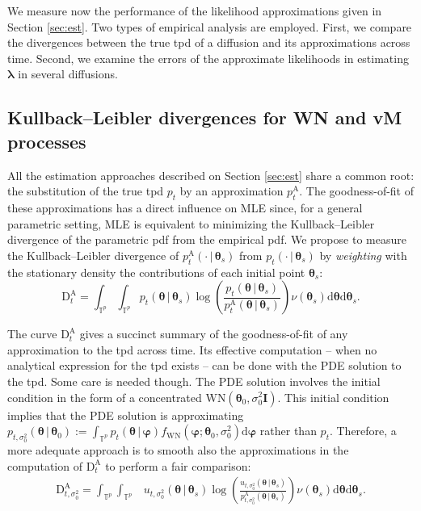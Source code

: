 \documentclass[oneside,11pt]{article}
\newcommand{\T}{\mathbb{T}}
\newcommand{\rd}{\mathrm{d}}
\newcommand{\bphi}{\boldsymbol\varphi}
\newcommand{\bthe}{\boldsymbol\theta}
\newcommand{\btheta}{\boldsymbol\theta}
\newcommand{\blambda}{\boldsymbol\lambda}
\newcommand{\bI}{\mathbf{I}}
\newcommand{\lrp}[1]{\left(#1\right)}
\begin{document}
We measure now the performance of the likelihood approximations given in Section \ref{sec:est}. Two types of empirical analysis are employed. First, we compare the divergences between the true tpd of a diffusion and its approximations across time. Second, we examine the errors of the approximate likelihoods in estimating $\blambda$ in several diffusions.

\subsection{Kullback--Leibler divergences for WN and vM processes}

All the estimation approaches described on Section \ref{sec:est} share a common root: the substitution of the true tpd $p_t$ by an approximation $p^\mathrm{A}_t$. The goodness-of-fit of these approximations has a direct influence on MLE since, for a general parametric setting, MLE is equivalent to minimizing the Kullback--Leibler divergence of the parametric pdf from the empirical pdf. We propose to measure the Kullback--Leibler divergence of $p^\mathrm{A}_t(\cdot\,|\,\btheta_s)$ from $p_t(\cdot\,|\,\btheta_s)$ by \textit{weighting} with the stationary density the contributions of each initial point $\btheta_s$:
\[
\mathrm{D}^\mathrm{A}_t=\int_{\T^p}\int_{\T^p}p_t(\btheta\,|\,\btheta_s)\log\lrp{\frac{p_t(\btheta\,|\,\btheta_s)}{p^\mathrm{A}_t(\btheta\,|\,\btheta_s)}}\nu(\btheta_s)\rd\btheta\rd\btheta_s.
\]

The curve $\mathrm{D}^\mathrm{A}_t$ gives a succinct summary of the goodness-of-fit of any approximation to the tpd across time. Its effective computation -- when no analytical expression for the tpd exists -- can be done with the PDE solution to the tpd. Some care is needed though. The PDE solution involves the initial condition in the form of a concentrated $\mathrm{WN}(\btheta_0,\sigma_0^2\bI)$. This initial condition implies that the PDE solution is approximating $p_{t,\sigma_0^2}(\bthe\,|\,\btheta_0):=\int_{\T^p}p_t(\bthe\,|\,\bphi)f_\mathrm{WN}(\bphi;\bthe_0,\sigma_0^2)\rd \bphi$ rather than $p_t$. Therefore, a more adequate approach is to smooth also the approximations in the computation of $\mathrm{D}^\mathrm{A}_t$ to perform a fair comparison:
\begin{align*}
\mathrm{D}^\mathrm{A}_{t,\sigma_0^2}=\int_{\T^p}\int_{\T^p}&u_{t,\sigma_0^2}(\btheta\,|\,\btheta_s)\log\lrp{\frac{u_{t,\sigma_0^2}(\btheta\,|\,\btheta_s)}{p^\mathrm{A}_{t,\sigma_0^2}(\btheta\,|\,\btheta_s)}} \nu(\btheta_s)\rd\btheta\rd\btheta_s.
\end{align*}
\end{document}
